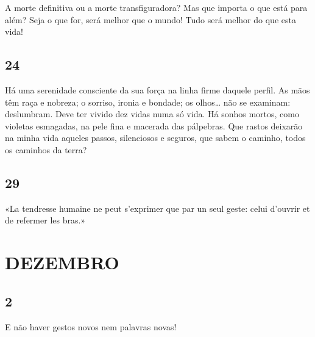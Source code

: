 A morte definitiva ou a morte transfiguradora?
Mas que importa o que está para além?
Seja o que for, será melhor que o mundo!
Tudo será melhor do que esta vida!

\subsection{24} 

Há uma serenidade consciente da sua força na
linha firme daquele perfil. As mãos têm raça e
nobreza; o sorriso, ironia e bondade; os olhos\ldots
não se examinam: deslumbram. Deve ter vivido dez
vidas numa só vida. Há sonhos mortos, como 
violetas esmagadas, na pele fina e macerada das pálpebras.
Que rastos deixarão na minha vida aqueles
passos, silenciosos e seguros, que sabem o caminho,
todos os caminhos da terra?

\subsection{29} 

«La tendresse humaine ne peut s’exprimer que
par un seul geste: celui d’ouvrir et de refermer les
bras.»

\section{DEZEMBRO}

\subsection{2} 

E não haver gestos novos nem palavras novas!